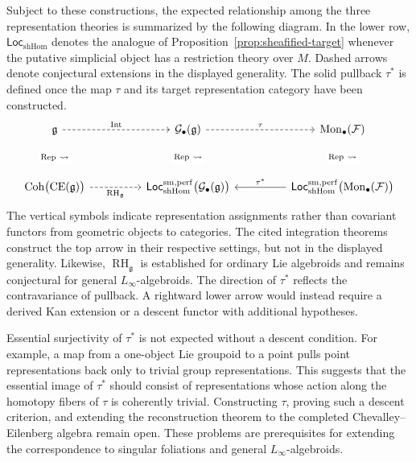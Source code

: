 \documentclass[12pt]{amsart}
\theoremstyle{definition}
\theoremstyle{remark}
\numberwithin{equation}{section}
\newcommand{\CF}{{\mathcal F}}
\newcommand{\1}{{\mathbb{1}}}
\newcommand{\CE}{\operatorname{CE}}
\newcommand{\Loc}{\mathsf{Loc}}
\newcommand{\RH}{\operatorname{RH}}
\begin{document}
Subject to these constructions, the expected relationship among the
three representation theories is summarized by the following diagram.
In the lower row, $\Loc_{\mathrm{shHom}}$ denotes the analogue of
Proposition~\ref{prop:sheafified-target} whenever the putative
simplicial object has a restriction theory over $M$.  Dashed arrows
denote conjectural extensions in the displayed generality.  The solid
pullback $\tau^*$ is defined once the map $\tau$ and its
target representation category have been constructed.
\[
\begin{tikzcd}[column sep=4.6em,row sep=3.2em]
\mathfrak g
 \arrow[r,dashed,"\operatorname{Int}"]
 \arrow[d,phantom,
 "\scriptstyle\operatorname{Rep}\ \leadsto" description]
&
\mathcal G_\bullet(\mathfrak g)
 \arrow[r,dashed,"\tau"]
 \arrow[d,phantom,
 "\scriptstyle\operatorname{Rep}\ \leadsto" description]
&
\operatorname{Mon}_\bullet(\CF)
 \arrow[d,phantom,
 "\scriptstyle\operatorname{Rep}\ \leadsto" description]
\\
\operatorname{Coh}\bigl(\CE(\mathfrak g)\bigr)
 \arrow[r,dashed,"\RH_{\mathfrak g}"']
&
\Loc_{\mathrm{shHom}}^{\mathrm{sm,perf}}
 \bigl(\mathcal G_\bullet(\mathfrak g)\bigr)
&
\Loc_{\mathrm{shHom}}^{\mathrm{sm,perf}}
 \bigl(\operatorname{Mon}_\bullet(\CF)\bigr)
 \arrow[l,"\tau^*"']
\end{tikzcd}
\]
The vertical symbols indicate representation assignments rather than
covariant functors from geometric objects to categories.  The cited
integration theorems construct the top arrow in their respective
settings, but not in the displayed generality.  Likewise,
$\RH_{\mathfrak g}$ is established for ordinary Lie algebroids and
remains conjectural for general $L_\infty$-algebroids.  The direction
of $\tau^*$ reflects the contravariance of pullback.  A rightward lower
arrow would instead require a derived Kan extension or a descent
functor with additional hypotheses.

Essential surjectivity of $\tau^*$ is not expected without a descent
condition.  For example, a map from a one-object Lie groupoid to a
point pulls point representations back only to trivial group
representations.  This suggests that the essential image of $\tau^*$
should consist of representations whose action along the homotopy
fibers of $\tau$ is coherently trivial.  Constructing $\tau$, proving
such a descent criterion, and extending the reconstruction theorem to
the completed Chevalley--\allowbreak Eilenberg algebra remain open.
These problems are prerequisites for extending the correspondence to
singular foliations and general $L_\infty$-algebroids.

\begingroup
\raggedright
\printbibliography
\endgroup
\end{document}
